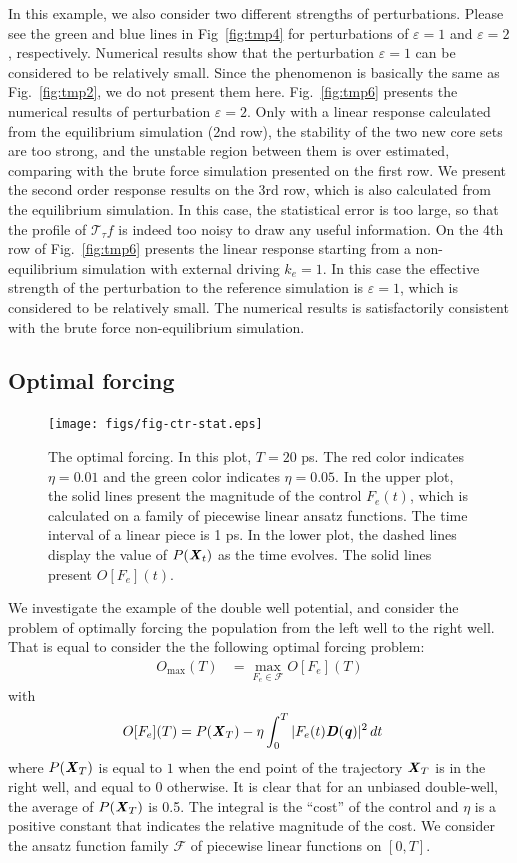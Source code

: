 \documentclass[aip,jcp,a4paper,reprint,onecolumn]{revtex4-1}
\newcommand{\vect}[1]{\textbf{\textit{#1}}}
\newcommand{\eps}{\varepsilon}
\newcommand{\mt}{\mathcal T}
\begin{document}
In this example, we also consider two different strengths of
perturbations. Please see the green and blue lines in Fig~\ref{fig:tmp4} for
perturbations of $\eps = 1$ and $\eps = 2$, respectively.
Numerical results show that the perturbation $\eps=1$ can be considered to be
relatively small. Since the phenomenon is basically the same as
Fig.~\ref{fig:tmp2}, we do not present them here.
Fig.~\ref{fig:tmp6} presents the numerical results of perturbation $\eps =
2$.  Only with a linear response calculated from the equilibrium
simulation (2nd row), the stability of the two new core sets are too
strong, and the unstable region between them is over estimated, comparing with
the brute force simulation presented on the first row.
We present the  second order response results on the 3rd row, which is
also calculated from the equilibrium simulation. In this case, the statistical
error is too large, so that
the profile of $\mt_\tau f$ is indeed too noisy to draw any useful information.
On the 4th row of Fig.~\ref{fig:tmp6} presents the linear response starting
from a non-equilibrium simulation with external driving $k_e = 1$.
In this case the effective strength of the perturbation to the reference
simulation is $\eps = 1$, which is considered to be relatively small.
The numerical results is satisfactorily consistent with the brute force
non-equilibrium simulation.


\subsection{Optimal forcing}
\begin{figure}
  \centering
  \texttt{[image: figs/fig-ctr-stat.eps]}
  \caption{The optimal forcing.  In this plot, $T=20$ ps.  The red
    color indicates $\eta = 0.01$ and the green color indicates $\eta
    = 0.05$.  In the upper plot, the solid lines present the magnitude
    of the control $F_e(t)$, which is calculated on a family of
    piecewise linear ansatz functions. The time interval of a linear
    piece is 1 ps.  In the lower plot, the dashed lines display the
    value of $P(\vect X_t)$ as the time evolves.  The solid lines
    present $O[F_e](t)$.  }\label{fig:tmp7}
\end{figure}

We investigate the example of the double well potential, and
consider the problem of optimally forcing the population from the
left well to the right well. That is equal to consider the 
the following optimal forcing problem:
\begin{align}
  O_{\max}(T)& = \max_{F_e\in\mathcal F} O[F_e](T) 
\end{align}
with
\begin{align}
  O[F_e](T) &= P(\vect X_T) - \eta \int_0^T\vert F_e(t)\vect D(\vect q)\vert^2\, dt
\end{align}
where $P(\vect X_T)$ is equal to $1$ when the end point of the
trajectory $\vect X_T$ is in the right well, and equal to 0 otherwise.
It is clear that for an unbiased double-well, the average of $P(\vect
X_T)$ is 0.5.  The integral is the ``cost'' of the control and $\eta$
is a positive constant that indicates the relative magnitude of the
cost. We consider the ansatz function family $\mathcal F$ of piecewise
linear functions on $[0, T]$.
\end{document}
